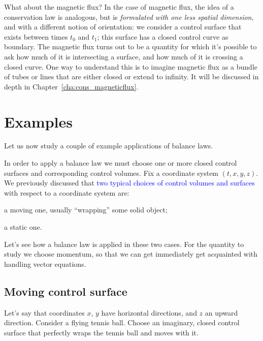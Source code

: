 \documentclass[a4paper,12pt,%
onecolumn,oneside,%
british%
]{memoir}
\renewcommand*{\|}[1][]{\nonscript\:#1\vert\nonscript\:\mathopen{}}
\newcommand*{\sect}{\S}%
\newcommand*{\chap}{Chapter}%
\renewcommand*{\autoref}[2]{\sidepar{\vspace{-1ex}\footnotesize{\color{blue}\faIcon{%
angle-right%
}\enskip\sect~\ref{#1} page~\pageref{#1}}}\textcolor{blue}{#2}}
\newcommand*{\yti}{t_{0}}
\newcommand*{\ytf}{t_{1}}
\begin{document}
\begin{extra}{What about the magnetic flux?}
  In the case of magnetic flux, the idea of a conservation law is analogous, but is \emph{formulated with one less spatial dimension}, and with a different notion of orientation: we consider a control surface that exists between times $\yti$ and $\ytf$; this surface has a closed control curve as boundary. The magnetic flux turns out to be a quantity for which it's possible to ask how much of it is intersecting a surface, and how much of it is crossing a closed curve. One way to understand this is to imagine magnetic flux as a bundle of tubes or lines that are either closed or extend to infinity. It will be discussed in depth in \chap~\ref{cha:cons_magneticflux}.
\end{extra}


\section{Examples}
\label{sec:example_balance_vect}

Let us now study a couple of example applications of balance laws.

In order to apply a balance law we must choose one or more closed control surfaces and corresponding control volumes. Fix a coordinate system $(t,x,y,z)$. We previously discussed that \autoref{sec:choice_control_volumes}{two typical choices of control volumes and surfaces} with respect to a coordinate system are:
\begin{enumerate*}[label=(\alph*)]
\item a moving one, usually \enquote{wrapping} some solid object;
\item a static one.
\end{enumerate*}
Let's see how a balance law is applied in these two cases. For the quantity to study we choose momentum, so that we can get immediately get acquainted with handling vector equations.

\subsection{Moving control surface}
\label{sec:example_balance_moving}

Let's say that coordinates $x$, $y$ have horizontal directions, and $z$ an upward direction. Consider a flying tennis ball. Choose an imaginary, closed control surface that perfectly wraps the tennis ball and moves with it.
\end{document}
